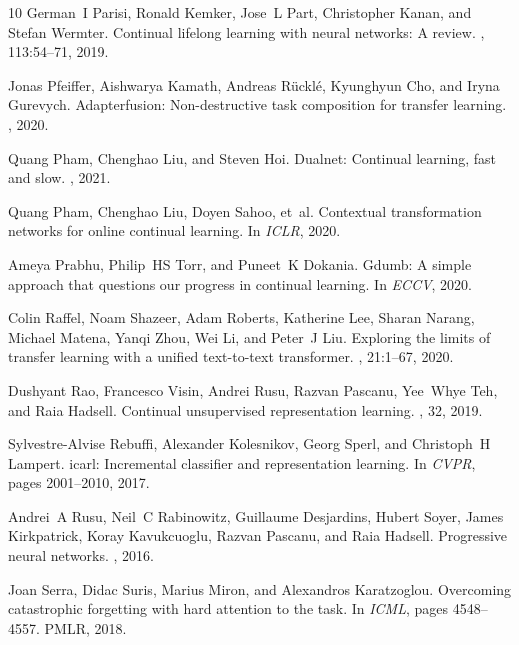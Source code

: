 \documentclass[10pt,twocolumn,letterpaper]{article}
\begin{document}
\begin{thebibliography}{10}
German~I Parisi, Ronald Kemker, Jose~L Part, Christopher Kanan, and Stefan
  Wermter.
\newblock Continual lifelong learning with neural networks: A review.
, 113:54--71, 2019.

Jonas Pfeiffer, Aishwarya Kamath, Andreas R{\"u}ckl{\'e}, Kyunghyun Cho, and
  Iryna Gurevych.
\newblock Adapterfusion: Non-destructive task composition for transfer
  learning.
, 2020.

Quang Pham, Chenghao Liu, and Steven Hoi.
\newblock Dualnet: Continual learning, fast and slow.
, 2021.

Quang Pham, Chenghao Liu, Doyen Sahoo, et~al.
\newblock Contextual transformation networks for online continual learning.
\newblock In {\em ICLR}, 2020.

Ameya Prabhu, Philip~HS Torr, and Puneet~K Dokania.
\newblock Gdumb: A simple approach that questions our progress in continual
  learning.
\newblock In {\em ECCV}, 2020.

Colin Raffel, Noam Shazeer, Adam Roberts, Katherine Lee, Sharan Narang, Michael
  Matena, Yanqi Zhou, Wei Li, and Peter~J Liu.
\newblock Exploring the limits of transfer learning with a unified text-to-text
  transformer.
, 21:1--67, 2020.

Dushyant Rao, Francesco Visin, Andrei Rusu, Razvan Pascanu, Yee~Whye Teh, and
  Raia Hadsell.
\newblock Continual unsupervised representation learning.
, 32, 2019.

Sylvestre-Alvise Rebuffi, Alexander Kolesnikov, Georg Sperl, and Christoph~H
  Lampert.
\newblock icarl: Incremental classifier and representation learning.
\newblock In {\em CVPR}, pages 2001--2010, 2017.

Andrei~A Rusu, Neil~C Rabinowitz, Guillaume Desjardins, Hubert Soyer, James
  Kirkpatrick, Koray Kavukcuoglu, Razvan Pascanu, and Raia Hadsell.
\newblock Progressive neural networks.
, 2016.

Joan Serra, Didac Suris, Marius Miron, and Alexandros Karatzoglou.
\newblock Overcoming catastrophic forgetting with hard attention to the task.
\newblock In {\em ICML}, pages 4548--4557. PMLR, 2018.


\end{thebibliography}
\end{document}
